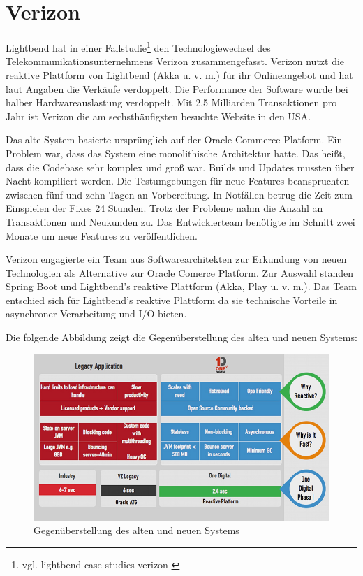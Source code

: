\section{Verizon}
Lightbend hat in einer Fallstudie\footnote{vgl. lightbend case studies verizon \cite{web:site:lightbend:case-studies:verizon} \label{casestudy:verizon}} den Technologiewechsel des Telekommunikationsunternehmens Verizon zusammengefasst. 
Verizon nutzt die reaktive Plattform von Lightbend (Akka u. v. m.) für ihr Onlineangebot und hat laut Angaben die Verkäufe verdoppelt. Die Performance der Software wurde bei halber Hardwareauslastung verdoppelt. Mit 2,5 Milliarden Transaktionen pro Jahr ist Verizon die  am sechsthäufigsten besuchte Website in den USA.

Das alte System basierte ursprünglich auf der Oracle Commerce Platform. Ein Problem war, dass das System eine monolithische Architektur hatte. Das heißt, dass die Codebase sehr komplex und groß war. Builds und Updates mussten über Nacht kompiliert werden. Die Testumgebungen für neue Features beanspruchten zwischen fünf und zehn Tagen an Vorbereitung. In Notfällen betrug die Zeit zum Einspielen der Fixes 24 Stunden. Trotz der Probleme nahm die Anzahl an Transaktionen und Neukunden zu. Das Entwicklerteam benötigte im Schnitt zwei Monate um neue Features zu veröffentlichen.

Verizon engagierte ein Team aus Softwarearchitekten zur Erkundung von neuen Technologien als Alternative zur Oracle Comerce Platform. Zur Auswahl standen Spring Boot und Lightbend's reaktive Plattform (Akka, Play u. v. m.). Das Team entschied sich für Lightbend's reaktive Plattform da sie technische Vorteile in asynchroner Verarbeitung und I/O bieten.

Die folgende Abbildung zeigt die Gegenüberstellung des alten und neuen Systems: 

\begin{figure}[H]
\caption{Gegenüberstellung des alten und neuen Systems}
\centering
\includegraphics[scale=.5]{./media/verizon.jpg}
\end{figure}

